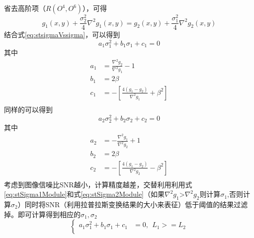 \documentclass[UTF8]{ctexart}
\begin{document}
\begin{sloppypar}
\begin{equation}
            \label{eq:g2h1StmForward}
        \end{equation}
        省去高阶项（$R(O^4,O^6)$），可得
        \begin{equation}
            g_1(x,y) + \frac{\sigma_2^2}{4}\nabla ^2 g_1(x,y) = g_2(x,y) + \frac{\sigma_1^2}{4}\nabla^{2}g_2(x,y)
            \label{eq:stg1vsg2}
        \end{equation}
        结合式\eqref{eq:stsigmaVssigma}，可以得到
        \begin{equation}
            a_1\sigma_1 ^2 + b_1 \sigma_1 +c_1 = 0
            \label{eq:stSigma1Module}
        \end{equation}
        其中
        \begin{equation}
            \begin{array}{cc}
                a_1 &= \frac{\nabla^2 g_2}{\nabla^2 g_1} -1\\
                b_1 &= 2\beta\\
                c_1 &= - \left[ \frac{4(g_1-g_2)}{\nabla^2 g_1} + \beta^2\right]\\
            \end{array}
            \label{eq:stSigma1Param}
        \end{equation}
        同样的可以得到
        \begin{equation}
            a_2\sigma_2 ^2 + b_2 \sigma_2 +c_2 = 0
            \label{eq:stSigma2Module}
        \end{equation}
        其中
        \begin{equation}
            \begin{array}{cc}
                a_2 &= -\frac{\nabla^2 g_1}{\nabla^2 g_2} +1\\
                b_2 &= 2\beta\\
                c_2 &= - \left[ \frac{4(g_1-g_2)}{\nabla^2 g_2} - \beta^2\right]\\
            \end{array}
            \label{eq:stSigma2Param}
        \end{equation}
        考虑到图像信噪比SNR越小，计算精度越差，交替利用利用式\eqref{eq:stSigma1Module}和式\eqref{eq:stSigma2Module}（如果$\nabla^2g_1$>$\nabla^2g_2$则计算$\sigma_1$,否则计算$\sigma_2$）同时将SNR（利用拉普拉斯变换结果的大小来表征）低于阈值的结果过滤掉。即可计算得到相应的$\sigma_1, \sigma_2$
        \begin{equation}
            \left\{
            \begin{array}{cc}
                a_1\sigma_1 ^2 + b_1 \sigma_1 +c_1 &= 0,\ \ L_1>=L_2\\

\end{array}
\end{equation}
\end{sloppypar}
\end{document}
